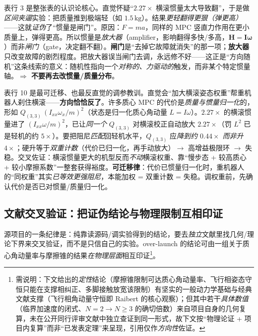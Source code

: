 \begin{insight}\label{ins:ld-gate-amp}
表行 3 是整张表的认识论核心。直觉怀疑“$2.27\times$ 横滚惯量太大导致翻”，于是做\emph{区间夹逼}实验：把质量推到极端轻（如 $1.5\,\mathrm{kg}$）。结果\emph{更轻翻得更狠（弹更高）}——这就\emph{证伪}了“惯量是闸门”。原因：$F=ma$，同样的 MPC 竖直力作用在更小质量上，弹得更高。所以惯量是\emph{放大器}（amplifier，影响翻得多快/多高，$\boldsymbol H=\boldsymbol I\boldsymbol\omega$）而非\emph{闸门}（gate，决定翻不翻）。\textbf{闸门}是“去掉它故障就消失”的那一项；\textbf{放大器}只改变故障的剧烈程度。把放大器误当闸门去调，永远修不好——这正是“方向随机”这条线索的意义：随机性指向一个\emph{对称的、力驱动的}触发，而非某个特定惯量轴。\textbf{$\Rightarrow$ 不要再去改惯量/质量分布}。
\end{insight}

\begin{insight}\label{ins:ld-weight-wrong}
表行 10 是最可迁移、也最反直觉的调参教训。直觉会“加大横滚姿态权重”帮重机器人刹住横滚——\textbf{方向恰恰反了}。许多质心 MPC 的代价是\emph{质量与惯量归一化}的，形如 $Q_{(3,3)}\,(I_{xx}\omega_x/m)^2$（状态是归一化质心角动量 $L=I\omega$）。$2.27\times$ 的横滚惯量进了 $(I_{xx}\omega/m)^2$，已让\emph{同一个} $Q_{(3,3)}$ 对横滚校正自动放大 $2.27\times$（罚 $L^2$ 已是轻机的约 $5\times$）。要把阻尼\emph{匹配}回轻机水平，$Q_{(3,3)}$ 应\emph{降到约 $0.44\times$ 而非升 $4\times$}；硬升等于\emph{双重计数}（代价已归一化，再手动放大）$\to$ 高增益极限环 $\to$ 失稳。交叉佐证：横滚惯量更大的机型反而\emph{不动}横滚权重、靠“慢步态 + 较高质心 + 较小摩擦系数”一整套获得裕度。\textbf{可迁移律}：代价已惯量归一化时，重机器人的“同权重”其实\emph{已等效更强阻尼}，本能加权 = 双重计数 = 失稳。调权重前，先确认代价是否已对惯量/质量归一化。
\end{insight}

\subsection{文献交叉验证：把证伪结论与物理限制互相印证}
\label{subsec:ld-ol-lit}

源项目的一条纪律是：纯靠读源码/调实验得到的结论，要去\emph{独立}文献里找几何/理论下界来交叉验证，而不是只信自己的实验。over-launch 的结论可由一组关于质心角动量率与摩擦锥的结果\emph{在物理层面}相互印证\footnote{需说明：下文给出的\emph{定性}结论（摩擦锥限制可达质心角动量率、飞行相姿态守恒只能在支撑相纠正、多脚接触放宽该限制）有坚实的一般动力学基础与经典文献支撑（飞行相角动量守恒即 Raibert 的核心观察）；但其中若干\emph{具体数值}（临界加速度的闭式、$N{=}2{\to}N{\ge}3$ 的确切倍数）来自项目自身的几何复算，未在公开同行评审文献中独立查证到同一形式，故下文按“物理论证 + 项目内复算”而非“已发表定理”来呈现，引用仅作\emph{方向性}佐证。}。

